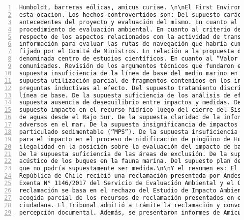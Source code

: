 \begin{Verbatim}[frame=lines, label=Elavoración propia -  Ejemplo de Contexto enviado por el Chatbot a OpenAI
				, fontsize=\scriptsize, numbers=left
				, baselinestretch=0.4
				, formatcom=\color{gray}]
Humboldt, barreras eólicas, amicus curiae. \n\nEl First Environmental Court Acoge la causa en
esta ocacion. Los hechos controvertidos son: Del supuesto carácter completo de los
antecedentes del proyecto y evaluación del mismo. En cuanto al término anticipado del
procedimiento de evaluación ambiental. En cuanto al criterio del propio Comité de Ministros
respecto de los aspectos relacionados con la actividad de transporte marítimo. De la supuesta
información para evaluar las rutas de navegación que habría cumplido con creces el estándar
fijado por el Comité de Ministros. En relación a la propuesta de la casa del Mar, luego
denominada centro de estudios científicos. En cuanto al “Valor Compartido” con las
comunidades. Revisión de los argumentos técnicos que fundaron el rechazo del proyecto. De la
supuesta insuficiencia de la línea de base del medio marino en las rutas de navegación. De la
supuesta utilización parcial de fragmentos contenidos en los informes de los Servicios, con
preguntas inductivas al efecto. Del supuesto tratamiento discriminatorio en lo relativo a la
línea de base. De la supuesta suficiencia de los análisis de efectos sinérgicos. De la
supuesta ausencia de desequilibrio entre impactos y medidas. De las Reclamaciones PAC. Del
supuesto impacto en el recurso hídrico luego del cierre del Sistema de Captación y Devolución
de aguas desde el Rajo Sur. De la supuesta claridad de la información para descartar impactos
adversos en el mar. De la supuesta insignificancia de impactos por aporte de material
particulado sedimentable (“MPS”). De la supuesta insuficiencia de la medida de compensación
para el impacto en el proceso de nidificación de pingüino de Humboldt. De la supuesta
ilegalidad en la posición sobre la evaluación del impacto de barreras eólicas en la avifauna.
De la supuesta suficiencia de las áreas de exclusión. De la supuesta evaluación del impacto
acústico de los buques en la fauna marina. Del supuesto plan de monitoreo de aves y cetáceos
que no podría supuestamente ser medida.\n\nY el resumen es: El Primer Tribunal Ambiental de la
República de Chile recibió una reclamación presentada por Andes Iron SpA contra la Resolución
Exenta N° 1146/2017 del Servicio de Evaluación Ambiental y el Comité de Ministros. La
reclamación se basa en el rechazo del Estudio de Impacto Ambiental del proyecto Dominga y la
acogida parcial de los recursos de reclamación presentados en el marco de la participación
ciudadana. El Tribunal admitió a trámite la reclamación y convocó a una audiencia de
percepción documental. Además, se presentaron informes de Amicus Curiae y se aceptó la

\end{Verbatim}
